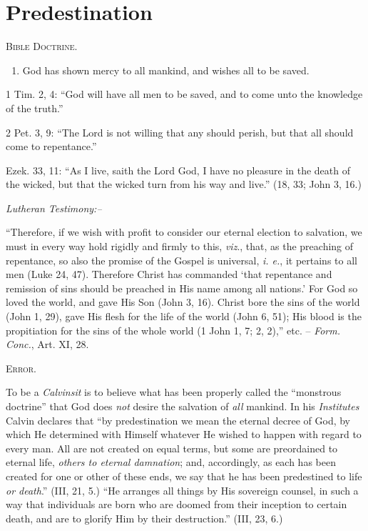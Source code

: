 \documentclass[
]{book}
\providecommand{\tightlist}{%
  \setlength{\itemsep}{0pt}\setlength{\parskip}{0pt}}
\begin{document}
\hypertarget{predestination}{%
\section*{\texorpdfstring{Predestination}{Predestination}}\label{predestination}}

\begin{center}
\textsc{Bible Doctrine.}
\end{center}

\begin{enumerate}
\def\labelenumi{\alph{enumi}.}
\tightlist
\item
  God has shown mercy to all mankind, and wishes all to be saved.
\end{enumerate}

1 Tim. 2, 4: ``God will have all men to be saved, and to come unto the knowledge of the truth.''

2 Pet. 3, 9: ``The Lord is not willing that any should perish, but that all should come to repentance.''

Ezek. 33, 11: ``As I live, saith the Lord God, I have no pleasure in the death of the wicked, but that the wicked turn from his way and live.'' (18, 33; John 3, 16.)

\begin{center}
\textsl{Lutheran Testimony:--}
\end{center}

``Therefore, if we wish with profit to consider our eternal election to salvation, we must in every way hold rigidly and firmly to this, \emph{viz}., that, as the preaching of repentance, so also the promise of the Gospel is universal, \emph{i. e.}, it pertains to all men (Luke 24, 47). Therefore Christ has commanded `that repentance and remission of sins should be preached in His name among all nations.' For God so loved the world, and gave His Son (John 3, 16). Christ bore the sins of the world (John 1, 29), gave His flesh for the life of the world (John 6, 51); His blood is the propitiation for the sins of the whole world (1 John 1, 7; 2, 2),'' etc. -- \emph{Form. Conc.}, Art. XI, 28.

\begin{center}
\textsc{Error.}
\end{center}

To be a \emph{Calvinsit} is to believe what has been properly called the ``monstrous doctrine'' that God does \emph{not} desire the salvation of \emph{all} mankind. In his \emph{Institutes} Calvin declares that ``by predestination we mean the eternal decree of God, by which He determined with Himself whatever He wished to happen with regard to every man. All are not created on equal terms, but some are preordained to eternal life, \emph{others to eternal damnation}; and, accordingly, as each has been created for one or other of these ends, we say that he has been predestined to life \emph{or death}.'' (III, 21, 5.) ``He arranges all things by His sovereign counsel, in such a way that individuals are born who are doomed from their inception to certain death, and are to glorify Him by their destruction.'' (III, 23, 6.)
\end{document}

